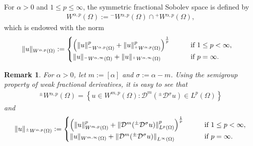 \documentclass[leqno,final]{siamltex}
\numberwithin{equation}{section}
\newtheorem{remark}{Remark}[section]
\renewcommand{\(}{\bigl(}
\renewcommand{\)}{\bigr)}
\begin{document}
    \begin{definition}
        For $  \alpha >0$ and $1 \leq p \leq \infty$, the symmetric fractional Sobolev space is defined by 
        \begin{align}\label{SFSS}
           { {W}^{\alpha,p}(\Omega)}:= {^{-}}{W}{^{\alpha,p}}(\Omega) \cap {^{+}}{W}{^{\alpha,p}}(\Omega),
        \end{align}
        which is endowed with the norm
        \begin{align}\label{SFSS_norm}
            \|u\|_{{ {W}^{\alpha,p}(\Omega)} } &:= \begin{cases} \displaystyle{
            \Bigl( \|u\|_{{^{-}}{W}{^{\alpha,p}}(\Omega)}^{p} + \|u\|_{{^{+}}{W}{^{\alpha,p}}(\Omega)}^{p} \Bigr)^{\frac{1}{p}} }  &\qquad \text{if } 1\leq p < \infty,\\
            \displaystyle{ \|u\|_{{^{-}}{W}{^{\alpha,\infty}}(\Omega)} + \|u \|_{{^{+}}{W}{^{\alpha,\infty}}(\Omega)} } &\qquad \text{if } p = \infty.
             \end{cases}
        \end{align}
    \end{definition}

\begin{remark}
	For $\alpha>0$, let $m :=[\alpha]$ and $\sigma:=\alpha- m$. Using the semigroup property of  weak fractional derivatives, it is easy to see that 
	\begin{align} \label{FSS_equiv}
	{^{\pm}}{W}{^{ \alpha , p}} (\Omega) = \left\{ u \in W^{m,p}(\Omega): 
	\mathcal{D}^m ({^{\pm}}{\mathcal{D}}{^{\sigma}} u) \in L^{p}(\Omega) \right\}
	\end{align}
	and
	\begin{align} \label{FSS_norm_equiv}
	\|u\|_{{^{\pm}}{W}{^{\alpha , p}}(\Omega)}:= \begin{cases}
	\Bigl(\left\|u\right\|_{W^{m,p}(\Omega)}^{p} + \left\|\mathcal{D}^m ({^{\pm}}{\mathcal{D}}{^{\sigma}}   u) \right\|_{L^{p}(\Omega)}^{p} \Bigr)^{\frac{1}{p}} &\qquad \text{if } 1 \leq p < \infty,\\
	\|u\|_{W^{m,\infty}(\Omega)} 
	+ \left\|\mathcal{D}^m ({^{\pm}}{\mathcal{D}}{^{\sigma}}  u) \right\|_{L^{\infty}(\Omega)} &\qquad \text{if } p = \infty.
	\end{cases}
	\end{align}
\end{remark}
\end{document}
